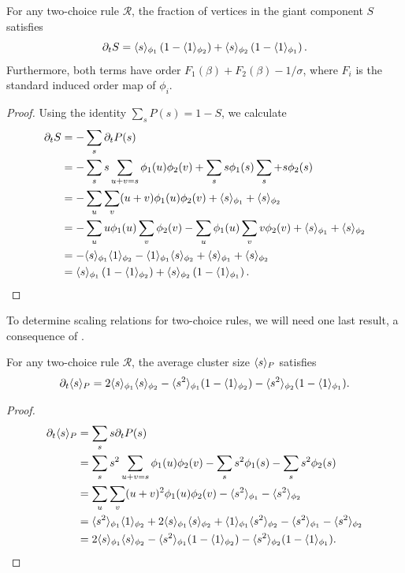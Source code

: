 \documentclass[twoside,10pt]{article}
\begin{document}
\begin{lem}
        \label{2c-sdelS}
        For any two-choice rule $\mathcal{R}$, the fraction of vertices in the giant component $S$ satisfies
	\[
		\partial_{t}{S} = \langle s \rangle_{\phi_1}\left( 1-\langle 1 \rangle_{\phi_2} \right) + \langle s \rangle_{\phi_2}\left( 1-\langle 1 \rangle_{\phi_1} \right).
	\] 
	Furthermore, both terms have order $F_1(\beta)+F_2(\beta)-1/\sigma$, where $F_i$ is the standard induced order map of $\phi_{i}$.
\end{lem}
\begin{proof}
        Using the identity $\sum_s P(s) = 1-S$, we calculate
        \begin{align*}
                \partial_{t}{S} &= - \sum_s \partial_{t}{P(s)} \\
                          &= - \sum_s s \sum_{u+v=s}\phi_1(u)\phi_2(v) + \sum_s s \phi_1(s) \sum_s + s \phi_2(s) \\
                          &= - \sum_u \sum_v (u+v) \phi_1(u)\phi_2(v) + \langle s \rangle_{\phi_1} + \langle s \rangle_{\phi_2} \\
                          &= -\sum_{u}u \phi_1(u) \sum_{v} \phi_2(v) - \sum_{u}\phi_1(u)\sum_{v}v \phi_2(v) + \langle s \rangle_{\phi_1} + \langle s \rangle_{\phi_2} \\
                          &= -\langle s \rangle_{\phi_1}\langle 1 \rangle_{\phi_2} - \langle 1 \rangle_{\phi_1}\langle s \rangle_{\phi_2} + \langle s \rangle_{\phi_1}+\langle s \rangle_{\phi_2} \\
                          &= \langle s \rangle_{\phi_1}\left( 1-\langle 1 \rangle_{\phi_2} \right) + \langle s \rangle_{\phi_2}\left( 1-\langle 1 \rangle_{\phi_1} \right).
        \end{align*}
\end{proof}

To determine scaling relations for two-choice rules, we will need one last result, a consequence of .

\begin{cor}
	\label{2c-sdel-sp}
	For any two-choice rule $\mathcal{R}$, the average cluster size $\langle s \rangle_{P}$ satisfies
\[
        \partial_{t}{\langle s \rangle_{P}} = 2\langle s \rangle_{\phi_1}\langle s \rangle_{\phi_2} - \langle s^2 \rangle_{\phi_1}(1-\langle 1 \rangle_{\phi_2}) - \langle s^2 \rangle_{\phi_2}(1-\langle 1 \rangle_{\phi_1}).
\]
\end{cor}
\begin{proof}
        \begin{align*}
                \partial_{t}{\langle s \rangle_{P}} &= \sum_s s \partial_{t}{P(s)} \\
                                    &= \sum_s s^2 \sum_{u+v=s}\phi_1(u)\phi_2(v) - \sum_s s^2 \phi_1(s) - \sum_s s^2 \phi_2(s) \\
                                    &= \sum_{u}\sum_{v} (u+v)^2\phi_1(u) \phi_2(v) - \langle s^2 \rangle_{\phi_1}-\langle s^2 \rangle_{\phi_2} \\
                                    &= \langle s^2 \rangle_{\phi_1}\langle 1 \rangle_{\phi_2} + 2\langle s \rangle_{\phi_1}\langle s \rangle_{\phi_2} + \langle 1 \rangle_{\phi_1}\langle s^2 \rangle_{\phi_2}- \langle s^2 \rangle_{\phi_1}-\langle s^2 \rangle_{\phi_2} \\
                                    &= 2\langle s \rangle_{\phi_1}\langle s \rangle_{\phi_2} - \langle s^2 \rangle_{\phi_1}(1-\langle 1 \rangle_{\phi_2}) - \langle s^2 \rangle_{\phi_2}(1-\langle 1 \rangle_{\phi_1}).
        \end{align*}
\end{proof}
\end{document}
